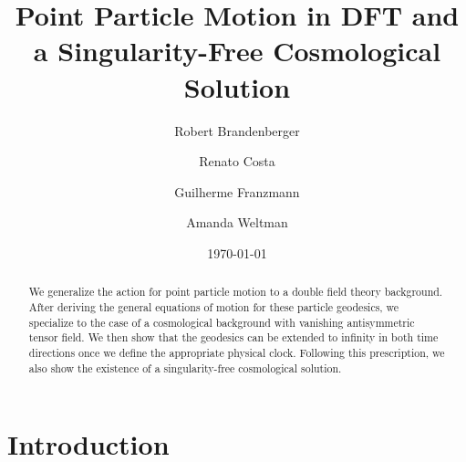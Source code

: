 \documentclass[prd, aps, superscriptaddress, preprintnumbers, twocolumn, floatfix, nofootinbib]{revtex4}
\begin{document}
\title {Point Particle Motion in DFT and a Singularity-Free Cosmological Solution}

\author{Robert Brandenberger}

\author{Renato Costa}

\author{Guilherme Franzmann}

\author{Amanda Weltman}

\date{\today}



\begin{abstract}

We generalize the action for point particle motion to a double field theory background.
After deriving the general equations of motion for these particle geodesics, we
specialize to the case of a cosmological background with vanishing antisymmetric
tensor field. We then show that the geodesics can be extended
to infinity in both time directions once we define the appropriate physical clock. Following this prescription, we also show the existence of a singularity-free cosmological solution.

\end{abstract}

\maketitle

\section{Introduction}
\end{document}

